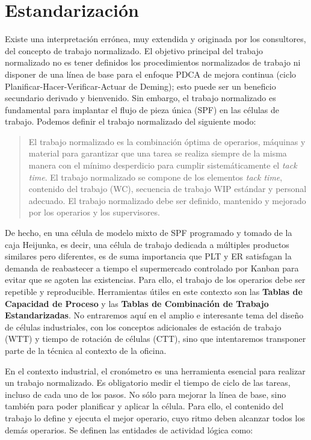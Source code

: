 \section {Estandarización}

Existe una interpretación errónea, muy extendida y originada por los consultores, del concepto de trabajo normalizado.
El objetivo principal del trabajo normalizado no es tener definidos los procedimientos normalizados de trabajo ni disponer de una línea de base para el enfoque PDCA de mejora continua (ciclo Planificar-Hacer-Verificar-Actuar de Deming); esto puede ser un beneficio secundario derivado y bienvenido.
Sin embargo, el trabajo normalizado es fundamental para implantar el flujo de pieza única (SPF) en las células de trabajo. Podemos definir el trabajo normalizado del siguiente modo:

\begin{quote}
    El trabajo normalizado es la combinación óptima de operarios, máquinas y material para garantizar que una tarea se realiza siempre de la misma manera con el mínimo desperdicio para cumplir sistemáticamente el \textit{tack time}.
    El trabajo normalizado se compone de los elementos \textit{tack time}, contenido del trabajo (WC), secuencia de trabajo WIP estándar y personal adecuado.
    El trabajo normalizado debe ser definido, mantenido y mejorado por los operarios y los supervisores.
\end{quote}

De hecho, en una célula de modelo mixto de SPF programado y tomado de la caja Heijunka, es decir, una célula de trabajo dedicada a múltiples productos similares pero diferentes, es de suma importancia que PLT y ER satisfagan la demanda de reabastecer a tiempo el supermercado controlado por Kanban para evitar que se agoten las existencias.
Para ello, el trabajo de los operarios debe ser repetible y reproducible.
Herramientas útiles en este contexto son las \textbf{Tablas de Capacidad de Proceso} y las \textbf{Tablas de Combinación de Trabajo Estandarizadas}. No entraremos aquí en el amplio e interesante tema del diseño de células industriales, con los conceptos adicionales de estación de trabajo (WTT) y tiempo de rotación de células (CTT), sino que intentaremos transponer parte de la técnica al contexto de la oficina.

En el contexto industrial, el cronómetro es una herramienta esencial para realizar un trabajo normalizado. Es obligatorio medir el tiempo de ciclo de las tareas, incluso de cada uno de los pasos. No sólo para mejorar la línea de base, sino también para poder planificar y aplicar la célula. Para ello, el contenido del trabajo lo define y ejecuta el mejor operario, cuyo ritmo deben alcanzar todos los demás operarios. Se definen las entidades de actividad lógica como:

